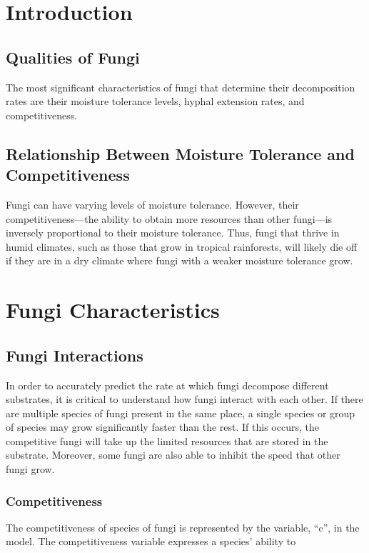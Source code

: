 \documentclass[twocolumn]{article} %
\begin{document}
\tableofcontents


\section{Introduction}

\subsection{Qualities of Fungi}
The most significant characteristics of fungi that determine their decomposition rates are their moisture tolerance levels, hyphal extension rates, and competitiveness. 
\subsection{Relationship Between Moisture Tolerance and Competitiveness}
Fungi can have varying levels of moisture tolerance. However, their competitiveness—the ability to obtain more resources than other fungi—is inversely proportional to their moisture tolerance. Thus, fungi that thrive in humid climates, such as those that grow in tropical rainforests, will likely die off if they are in a dry climate where fungi with a weaker moisture tolerance grow.

\section{Fungi Characteristics}

\subsection{Fungi Interactions}
In order to accurately predict the rate at which fungi decompose different substrates, it is critical to understand how fungi interact with each other. If there are multiple species of fungi present in the same place, a single species or group of species may grow significantly faster than the rest. If this occurs, the competitive fungi will take up the limited resources that are stored in the substrate. Moreover, some fungi are also able to inhibit the speed that other fungi grow. 

\subsubsection{Competitiveness}
The competitiveness of species of fungi is represented by the variable, “c”, in the model. The competitiveness variable expresses a species’ ability to 
\end{document}
